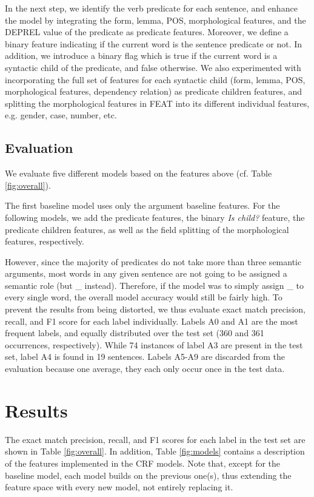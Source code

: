 \documentclass[a4paper,twoside,12pt]{article}
\begin{document}
In the next step, we identify the verb predicate for each sentence, and enhance the model by integrating the form, lemma, POS, morphological features, and the DEPREL value of the predicate as predicate features. Moreover, we define a binary feature indicating if the current word is the sentence predicate or not. In addition, we introduce a binary flag which is true if the current word is a syntactic child of the predicate, and false otherwise. We also experimented with incorporating the full set of features for each syntactic child (form, lemma, POS, morphological features, dependency relation) as predicate children features, and splitting the morphological features in FEAT into its different individual features, e.g. gender, case, number, etc.

\subsection{Evaluation}
\label{sub:eval}

We evaluate five different models based on the features above (cf. Table \ref{fig:overall}).

The first baseline model uses only the argument baseline features. For the following models, we add the predicate features, the binary \textit{Is child?} feature, the predicate children features, as well as the field splitting of the morphological features, respectively.

However, since the majority of predicates do not take more than three semantic arguments, most words in any given sentence are not going to be assigned a semantic role (but {\ttfamily \_} instead). Therefore, if the model was to simply assign {\ttfamily \_} to every single word, the overall model accuracy would still be fairly high. To prevent the results from being distorted, we thus evaluate exact match precision, recall, and F1 score for each label individually. Labels A0 and A1 are the most frequent labels, and equally distributed over the test set (360 and 361 occurrences, respectively). While 74 instances of label A3 are present in the test set, label A4 is found in 19 sentences. Labels A5-A9 are discarded from the evaluation because one average, they each only occur once in the test data. 

\section{Results}
\label{sec:res}

The exact match precision, recall, and F1 scores for each label in the test set are shown in Table \ref{fig:overall}. In addition, Table \ref{fig:models} contains a description of the features implemented in the CRF models. Note that, except for the baseline model, each model builds on the previous one(s), thus extending the feature space with every new model, not entirely replacing it.\vspace{5pt}
\end{document}
